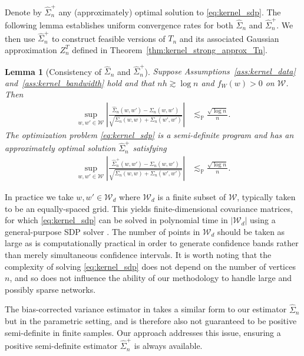 \documentclass[11pt,lof]{puthesis}
\renewcommand{\P}{\ensuremath{\mathbb{P}}}
\newcommand{\cW}{\ensuremath{\mathcal{W}}}
\theoremstyle{break}
\newtheorem{lemma}{Lemma}[section]
\theoremstyle{proof}
\begin{document}
Denote by $\hat\Sigma_n^+$ any (approximately) optimal solution to
\eqref{eq:kernel_sdp}. The following lemma establishes uniform convergence rates
for both $\hat \Sigma_n$ and $\hat \Sigma_n^+$.
We then use $\hat \Sigma_n^+$ to construct feasible versions of $T_n$ and its
associated Gaussian approximation $Z_n^{T}$ defined in
Theorem~\ref{thm:kernel_strong_approx_Tn}.
%
\begin{lemma}[Consistency of $\hat \Sigma_n$ and $\hat \Sigma_n^+$]
  \label{lem:kernel_sdp}
  Suppose Assumptions~\ref{ass:kernel_data} and~\ref{ass:kernel_bandwidth} hold
  and that $n h \gtrsim \log n$ and $f_W(w) > 0$ on $\cW$. Then
  \begin{align*}
    \sup_{w,w' \in \cW}
    \left| \frac{\hat \Sigma_n(w,w') - \Sigma_n(w,w')}
    {\sqrt{\Sigma_n(w,w) + \Sigma_n(w',w')}} \right|
    &\lesssim_\P \frac{\sqrt{\log n}}{n}.
  \end{align*}
  The optimization problem \eqref{eq:kernel_sdp} is a semi-definite
  program
  \citep[SDP,][]{laurent2005semidefinite} and has an approximately optimal
  solution $\hat\Sigma_n^+$ satisfying
  \begin{align*}
    \sup_{w,w' \in \cW} \left|
      \frac{\hat \Sigma_n^+(w,w') - \Sigma_n(w,w')}
    {\sqrt{\Sigma_n(w,w) + \Sigma_n(w',w')}} \right|
    &\lesssim_\P \frac{\sqrt{\log n}}{n}.
  \end{align*}
\end{lemma}

In practice we take $w, w' \in \cW_d$ where $\cW_d$ is a finite subset of
$\cW$, typically taken to be an equally-spaced grid. This yields
finite-dimensional covariance matrices, for which \eqref{eq:kernel_sdp} can be
solved
in polynomial time in $|\cW_d|$ using a general-purpose SDP solver
\citep[e.g.\ by interior point methods,][]{laurent2005semidefinite}.
The number of points in $\cW_d$ should be taken as large as is computationally
practical in order to generate confidence bands rather than merely simultaneous
confidence intervals. It is worth noting that the complexity of solving
\eqref{eq:kernel_sdp} does not depend on the number of vertices $n$, and so
does not
influence the ability of our methodology to handle large and possibly sparse
networks.

The bias-corrected variance estimator in
\citet[Section~3.2]{matsushita2021jackknife} takes a similar form to our
estimator
$\hat\Sigma_n$ but in the parametric setting, and is therefore also not
guaranteed to be positive semi-definite in finite samples. Our approach
addresses this issue, ensuring a positive semi-definite estimator
$\hat\Sigma_n^+$ is always available.
\end{document}
